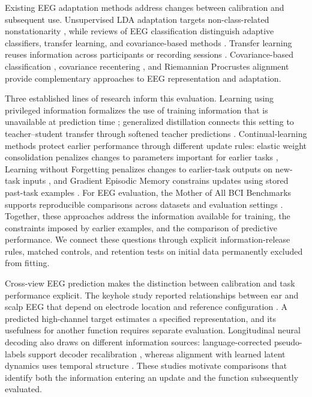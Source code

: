 \documentclass[11pt,a4paper]{article}
\begin{document}
Existing EEG adaptation methods address changes between calibration and subsequent use. Unsupervised LDA adaptation targets non-class-related nonstationarity \cite{vidaurre2011}, while reviews of EEG classification distinguish adaptive classifiers, transfer learning, and covariance-based methods \cite{lotte2018}. Transfer learning reuses information across participants or recording sessions \cite{jayaram2016}. Covariance-based classification \cite{barachant2012}, covariance recentering \cite{zanini2018}, and Riemannian Procrustes alignment \cite{rodrigues2019} provide complementary approaches to EEG representation and adaptation.

Three established lines of research inform this evaluation. Learning using privileged information formalizes the use of training information that is unavailable at prediction time \cite{vapnik2009}; generalized distillation connects this setting to teacher--student transfer through softened teacher predictions \cite{lopezpaz2016}. Continual-learning methods protect earlier performance through different update rules: elastic weight consolidation penalizes changes to parameters important for earlier tasks \cite{kirkpatrick2017}, Learning without Forgetting penalizes changes to earlier-task outputs on new-task inputs \cite{li2018}, and Gradient Episodic Memory constrains updates using stored past-task examples \cite{lopezpaz2017}. For EEG evaluation, the Mother of All BCI Benchmarks supports reproducible comparisons across datasets and evaluation settings \cite{jayaram2018}. Together, these approaches address the information available for training, the constraints imposed by earlier examples, and the comparison of predictive performance. We connect these questions through explicit information-release rules, matched controls, and retention tests on initial data permanently excluded from fitting.

Cross-view EEG prediction makes the distinction between calibration and task performance explicit. The keyhole study reported relationships between ear and scalp EEG that depend on electrode location and reference configuration \cite{mikkelsen2017}. A predicted high-channel target estimates a specified representation, and its usefulness for another function requires separate evaluation. Longitudinal neural decoding also draws on different information sources: language-corrected pseudo-labels support decoder recalibration \cite{fan2023}, whereas alignment with learned latent dynamics uses temporal structure \cite{karpowicz2025}. These studies motivate comparisons that identify both the information entering an update and the function subsequently evaluated.
\end{document}
